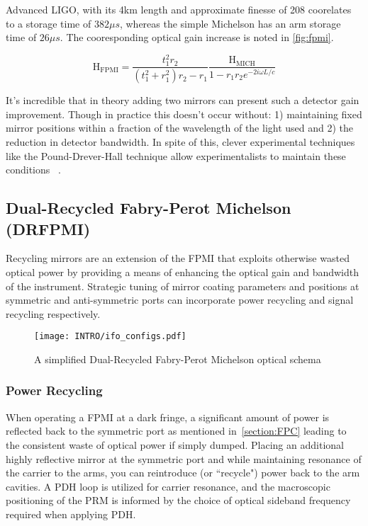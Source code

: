 {Advanced LIGO, with its 4km length and approximate finesse of 208 coorelates to a storage time of $382\mu s$, whereas the simple Michelson has an arm storage time of $26 \mu s$. The cooresponding optical gain increase is noted in \ref{fig:fpmi}. 

\begin{equation}
	\mathrm{H_{FPMI}} = \frac{t_1 ^2 r_2}{(t_1^2 + r_1^2)r_2 - r_1} \frac{\mathrm{H_{MICH}}}{1 - r_1 r_2 e^{-2i \omega L / c}}
\end{equation}

It's incredible that in theory adding two mirrors can present such a detector gain improvement. Though in practice this doesn't occur without: 1) maintaining fixed mirror positions within a fraction of the wavelength of the light used and 2) the reduction in detector bandwidth. In spite of this, clever experimental techniques like the Pound-Drever-Hall technique allow experimentalists to maintain these conditions ~\cite{?}.

\subsection{Dual-Recycled Fabry-Perot Michelson (DRFPMI)}
Recycling mirrors are an extension of the FPMI that exploits otherwise wasted optical power by providing a means of enhancing the optical gain and bandwidth of the instrument. Strategic tuning of mirror coating parameters and positions at symmetric and anti-symmetric ports can incorporate power recycling and signal recycling respectively.

\begin{figure}[ht!]
\begin{center}
\texttt{[image: INTRO/ifo\_configs.pdf]}
\end{center}
\caption{A simplified Dual-Recycled Fabry-Perot Michelson optical schema}
\label{fig:drfp_michelson}
\end{figure}

\subsubsection{Power Recycling}
When operating a FPMI at a dark fringe, a significant amount of power is reflected back to the symmetric port as mentioned in~\ref{section:FPC} leading to the consistent waste of optical power if simply dumped. Placing an additional highly reflective mirror at the symmetric port and while maintaining resonance of the carrier to the arms, you can reintroduce (or ``recycle") power back to the arm cavities. A PDH loop is utilized for carrier resonance, and the macroscopic positioning of the PRM is informed by the choice of optical sideband frequency required when applying PDH. 

}
